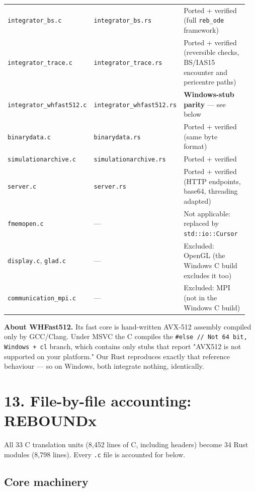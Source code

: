 \documentclass[11pt]{article}
\begin{document}
\begin{longtable}{L{0.171\linewidth}L{0.099\linewidth}L{0.679\linewidth}}
\texttt{integrator\_bs.c} & \texttt{integrator\_bs.rs} & Ported + verified (full \texttt{reb\_ode} framework) \\
\texttt{integrator\_trace.c} & \texttt{integrator\_trace.rs} & Ported + verified (reversible checks, BS/IAS15 encounter and pericentre paths) \\
\texttt{integrator\_whfast512.c} & \texttt{integrator\_whfast512.rs} & \textbf{Windows-stub parity} --- see below \\
\texttt{binarydata.c} & \texttt{binarydata.rs} & Ported + verified (same byte format) \\
\texttt{simulationarchive.c} & \texttt{simulationarchive.rs} & Ported + verified \\
\texttt{server.c} & \texttt{server.rs} & Ported + verified (HTTP endpoints, base64, threading adapted) \\
\texttt{fmemopen.c} & --- & Not applicable: replaced by \texttt{std::io::Cursor} \\
\texttt{display.c}, \texttt{glad.c} & --- & Excluded: OpenGL (the Windows C build excludes it too) \\
\texttt{communication\_mpi.c} & --- & Excluded: MPI (not in the Windows C build) \\
\bottomrule
\end{longtable}

\textbf{About WHFast512.} Its fast core is hand-written AVX-512 assembly compiled only by GCC/Clang. Under MSVC the C compiles the \texttt{\#else // Not 64 bit, Windows + cl} branch, which contains only stubs that report "AVX512 is not supported on your platform." Our Rust reproduces exactly that reference behaviour --- so on Windows, both integrate nothing, identically.

\section{13. File-by-file accounting: REBOUNDx}

All 33 C translation units (8,452 lines of C, including headers) become 34 Rust modules (8,798 lines). Every \texttt{.c} file is accounted for below.

\subsection{Core machinery}
\end{document}
